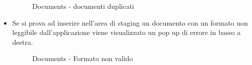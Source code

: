 \documentclass[10pt, a4paper]{article}
\begin{document}
\begin{itemize}
    \begin{figure}[H]
        \centering  
        \caption{Documents - documenti duplicati}
        \label{img:duplicatedDocuments}
    \end{figure}
    \item Se si prova ad inserire nell'area di staging un documento con un formato non leggibile dall'applicazione viene visualizzato un pop up di errore in basso a destra.
    \begin{figure}[H]
        \centering  
        \caption{Documents - Formato non valido}
        \label{img:invalidFormat}
    \end{figure}
\end{itemize}
\end{document}
